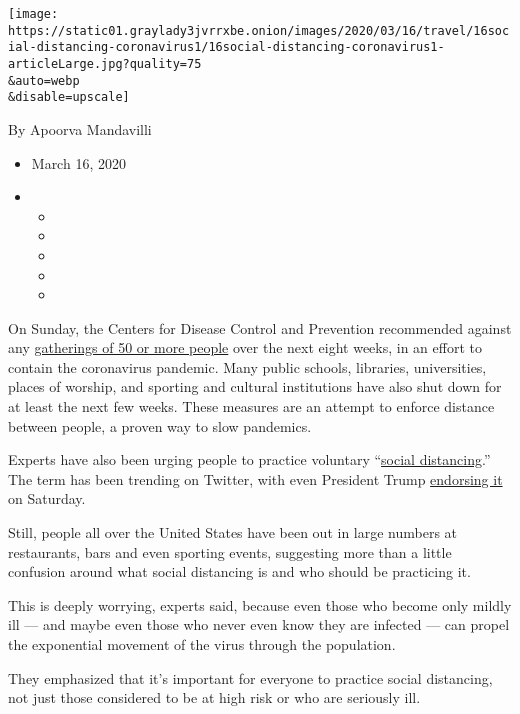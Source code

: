 \texttt{[image: https://static01.graylady3jvrrxbe.onion/images/2020/03/16/travel/16social-distancing-coronavirus1/16social-distancing-coronavirus1-articleLarge.jpg?quality=75\\\&auto=webp\\\&disable=upscale]}

By Apoorva Mandavilli

\begin{itemize}
\item
  March 16, 2020
\item
  \begin{itemize}
  \item
  \item
  \item
  \item
  \item
  \end{itemize}
\end{itemize}

On Sunday, the Centers for Disease Control and Prevention recommended
against any
\href{https://www.cdc.gov/coronavirus/2019-ncov/community/large-events/mass-gatherings-ready-for-covid-19.html}{gatherings
of 50 or more people} over the next eight weeks, in an effort to contain
the coronavirus pandemic. Many public schools, libraries, universities,
places of worship, and sporting and cultural institutions have also shut
down for at least the next few weeks. These measures are an attempt to
enforce distance between people, a proven way to slow pandemics.

Experts have also been urging people to practice voluntary
``\href{https://www.nytimes3xbfgragh.onion/2020/04/14/us/bishop-gerald-glenn-coronavirus.html}{social
distancing}.'' The term has been trending on Twitter, with even
President Trump
\href{https://twitter.com/realDonaldTrump/status/1238824050924883968}{endorsing
it} on Saturday.

Still, people all over the United States have been out in large numbers
at restaurants, bars and even sporting events, suggesting more than a
little confusion around what social distancing is and who should be
practicing it.

This is deeply worrying, experts said, because even those who become
only mildly ill --- and maybe even those who never even know they are
infected --- can propel the exponential movement of the virus through
the population.

They emphasized that it's important for everyone to practice social
distancing, not just those considered to be at high risk or who are
seriously ill.

